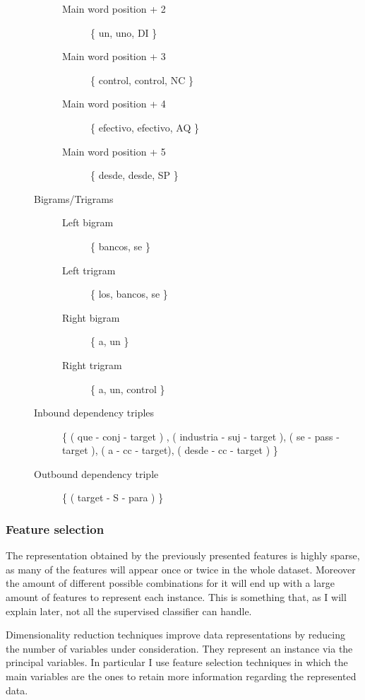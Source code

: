 \begin{example}
\begin{description}
\begin{description}
\begin{description}
            \item[Main word position + 2] \{ un, uno, DI \}
            \item[Main word position + 3] \{ control, control, NC \}
            \item[Main word position + 4] \{ efectivo, efectivo, AQ \}
            \item[Main word position + 5] \{ desde, desde, SP \}
          \end{description}
        \item[Bigrams/Trigrams]\hfill
          \begin{description}
            \item[Left bigram] \{ bancos, se \}
            \item[Left trigram] \{ los, bancos, se \}
            \item[Right bigram] \{ a, un \}
            \item[Right trigram] \{ a, un, control \}
          \end{description}
        \item[Inbound dependency triples] \{ ( que - conj - target ) , (
          industria - suj - target ), ( se - pass - target ),
          ( a - cc - target), ( desde - cc - target ) \}
        \item[Outbound dependency triple] \{ ( target - S - para ) \}
      \end{description}
  \end{description}
\end{example}

\subsubsection{Feature selection}

The representation obtained by the previously presented features is highly
sparse, as many of the features will appear once or twice in the whole dataset.
Moreover the amount of different possible combinations for it will end up with
a large amount of features to represent each instance. This is something that,
as I will explain later, not all the supervised classifier can handle.

Dimensionality reduction techniques improve data representations by reducing
the number of variables under consideration. They represent an instance via the
principal variables. In particular I use feature selection techniques in which
the main variables are the ones to retain more information regarding the
represented data.

